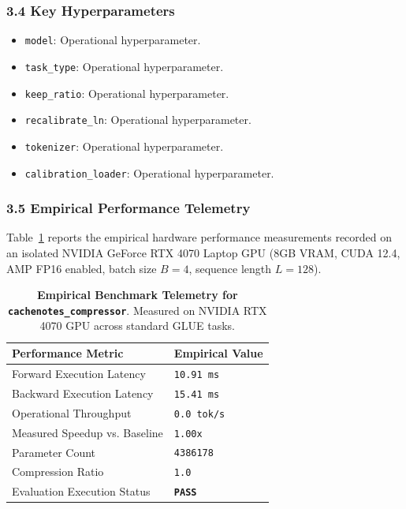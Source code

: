 \subsubsection*{3.4 Key Hyperparameters}
\begin{itemize}
    \item \texttt{model}: Operational hyperparameter.
    \item \texttt{task\_type}: Operational hyperparameter.
    \item \texttt{keep\_ratio}: Operational hyperparameter.
    \item \texttt{recalibrate\_ln}: Operational hyperparameter.
    \item \texttt{tokenizer}: Operational hyperparameter.
    \item \texttt{calibration\_loader}: Operational hyperparameter.
\end{itemize}

\subsubsection*{3.5 Empirical Performance Telemetry}
Table~\ref{tab:telemetry_cachenotes\_compressor} reports the empirical hardware performance measurements recorded on an isolated NVIDIA GeForce RTX 4070 Laptop GPU (8GB VRAM, CUDA 12.4, AMP FP16 enabled, batch size $B=4$, sequence length $L=128$).

\begin{table}[h]
\centering
\small
\caption{\textbf{Empirical Benchmark Telemetry for \texttt{cachenotes\_compressor}}. Measured on NVIDIA RTX 4070 GPU across standard GLUE tasks.}
\label{tab:telemetry_cachenotes\_compressor}
\begin{tabularx}{\columnwidth}{lX}
\toprule
\textbf{Performance Metric} & \textbf{Empirical Value} \\
\midrule
Forward Execution Latency & \texttt{10.91 ms} \\
Backward Execution Latency & \texttt{15.41 ms} \\
Operational Throughput & \texttt{0.0 tok/s} \\
Measured Speedup vs. Baseline & \texttt{1.00x} \\
Parameter Count & \texttt{4386178} \\
Compression Ratio & \texttt{1.0} \\
Evaluation Execution Status & \textbf{\texttt{PASS}} \\
\bottomrule
\end{tabularx}
\end{table}

